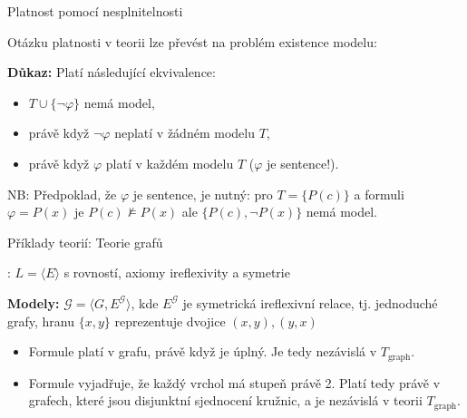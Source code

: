 \documentclass{beamer}
\begin{document}
\begin{frame}{Platnost pomocí nesplnitelnosti}

    Otázku platnosti v teorii lze převést na problém existence modelu:

    \medskip


    \medskip

    \textbf{Důkaz:}
        Platí následující ekvivalence: 
        \begin{itemize}
            \item $T\cup\{\neg\varphi\}$ nemá model,
            \item právě když $\neg\varphi$ neplatí v žádném modelu $T$,
            \item právě když $\varphi$ platí v každém modelu $T$  ($\varphi$ je sentence!). \hfill\qedsymbol
        \end{itemize}


    NB: Předpoklad, že $\varphi$ je sentence, je nutný: pro $T=\{P(c)\}$ a formuli $\varphi=P(x)$ je $P(c)\not\models P(x)$ ale $\{P(c),\neg P(x)\}$ nemá model.

\end{frame}


\begin{frame}{Příklady teorií: Teorie grafů}
    
    : $L=\langle E\rangle$ s rovností, axiomy \alert{ireflexivity} a \alert{symetrie}
    

    \textbf{Modely:} $\mathcal G=\langle G,E^\mathcal G\rangle$, kde $E^\mathcal G$ je symetrická ireflexivní relace, tj. \alert{jednoduché} grafy, hranu $\{x,y\}$ reprezentuje dvojice $(x,y),(y,x)$
    \begin{itemize}
        \item Formule  platí v grafu, právě když je \alert{úplný}. Je tedy nezávislá v $T_\text{graph}$.
        \item Formule   vyjadřuje, že každý vrchol má stupeň právě 2. Platí tedy právě v grafech, které jsou disjunktní sjednocení kružnic, a je nezávislá v teorii $T_\text{graph}$.
    \end{itemize}

\end{frame}
\end{document}
